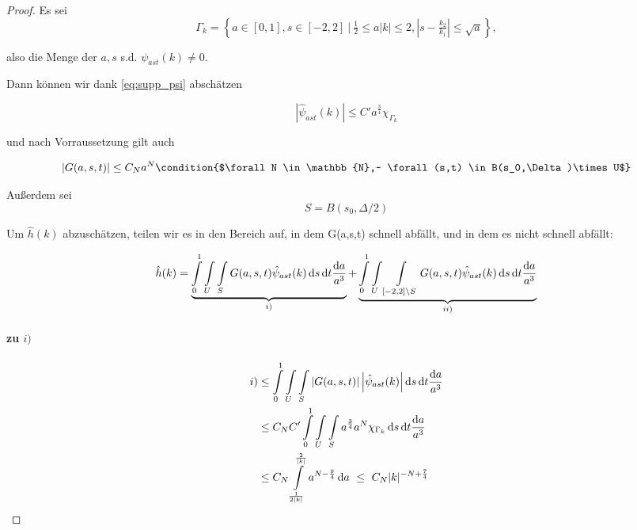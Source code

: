 \begin{proof}
Es sei
\begin{equation*}
    \Gamma_k = \left\{a\in [0,1], s \in [-2,2] ~\Big|~ \tfrac{1}{2} \leq a|k| \leq 2 , \left|s-\tfrac{k_2}{k_1} \right| \leq \sqrt a
                   \right\},
\end{equation*}

also die Menge der $a,s$ s.d. $\psi_{ast}(k) \neq 0$.

Dann können wir dank \cref{eq:supp_psi} abschätzen

\begin{equation*}
    | \hat \psi_{ast} (k)| \leq C' a^{\frac{3}{4}} \chi_{\Gamma_k}
\end{equation*}

und nach Vorraussetzung gilt auch

\begin{equation*}
    |G(a,s,t)| \leq C_{N} a^{N}
    \condition{$\forall N \in \mathbb{N},~ \forall (s,t) \in B(s_0,\Delta)\times U$}
\end{equation*}

Außerdem sei
\begin{equation*}
    S = B(s_0,\Delta/2)
\end{equation*}

Um $\hat h(k)$ abzuschätzen, teilen wir es in den Bereich auf, in dem G(a,s,t) schnell abfällt, und in dem es nicht schnell abfällt:

\begin{dmath*}
    \hat h(k) =
    \underbrace{
    \int \limits_0^1 \int \limits_U \int \limits_{S}
    G(a,s,t) \hat \psi_{ast} (k)
        \d s \d t \frac{\d a}{a^3}}_{i)}
     +
    \underbrace{
     \int \limits_0^1 \int \limits_U \int \limits_{[-2,2]\setminus S}
    G(a,s,t) \hat \psi_{ast} (k)
        \d s \d t \frac{\d a}{a^3}}_{ii)}
\end{dmath*}



\paragraph{zu $i)$}
\begin{align*}
    i) &\leq
     \int \limits_0^1 \int \limits_U \int \limits_{S}
    \left\lvert G(a,s,t)\right\rvert
    \left\lvert \hat \psi_{ast} (k) \right\rvert
        \mathop{}\!\mathrm{d} s \mathop{}\!\mathrm{d} t \frac{\mathop{}\!\mathrm{d} a}{a^3}
    \\ &\leq
    C_N C'
    \int \limits_0^1 \int \limits_U \int \limits_{S}
    a^{\frac{3}{4}} a^N \chi_{\Gamma_k} \mathop{}\!\mathrm{d} s \mathop{}\!\mathrm{d} t \frac{\mathop{}\!\mathrm{d} a}{a^3}
    \\ &\leq
    C_N \int \limits_{\frac{1}{2|k|}}^{\frac{2}{|k|}}
    a^{N-\frac{9}{4}} \mathop{}\!\mathrm{d} a
    ~\leq~
     C_N |k|^{-N+\frac{7}{4}}
\end{align*}


\end{proof}
